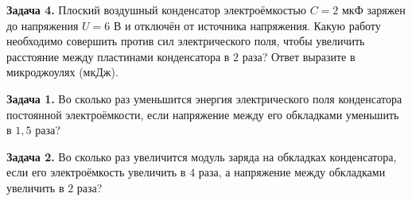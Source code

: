 \begin{taskbasic}[code={\label{task:elem_cap_v16_n25}}]
\textbf{Задача 4.} Плоский воздушный конденсатор электроёмкостью $C = 2\text{ мкФ}$ заряжен до напряжения $U = 6\text{ В}$ и отключён от источника напряжения. Какую работу необходимо совершить против сил электрического поля, чтобы увеличить расстояние между пластинами конденсатора в $2$ раза? Ответ выразите в микроджоулях (мкДж).

\end{taskbasic}


\begin{taskbasic}[code={\label{task:elem_cap_v21_n11}}]
\textbf{Задача 1.} Во сколько раз уменьшится энергия электрического поля конденсатора постоянной электроёмкости, если напряжение между его обкладками уменьшить в $1{,}5$ раза?

\end{taskbasic}

\begin{taskbasic}[code={\label{task:elem_cap_v22_n11}}]
\textbf{Задача 2.} Во сколько раз увеличится модуль заряда на обкладках конденсатора, если его электроёмкость увеличить в $4$ раза, а напряжение между обкладками увеличить в $2$ раза?

\end{taskbasic}

